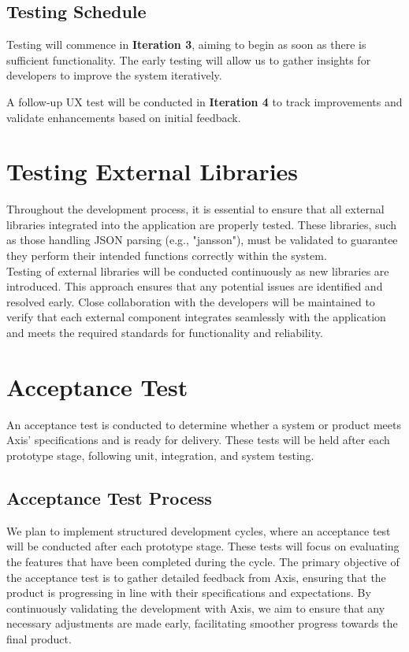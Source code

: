 \documentclass{article}
\begin{document}
\subsection{Testing Schedule}
Testing will commence in \textbf{Iteration 3}, aiming to begin as soon as there is sufficient functionality. The early testing will allow us to gather insights for developers to improve the system iteratively.

A follow-up UX test will be conducted in \textbf{Iteration 4} to track improvements and validate enhancements based on initial feedback.



\section{Testing External Libraries}
Throughout the development process, it is essential to ensure that all external libraries integrated into the application are properly tested. These libraries, such as those handling JSON parsing (e.g., "jansson"), must be validated to guarantee they perform their intended functions correctly within the system.\\

Testing of external libraries will be conducted continuously as new libraries are introduced. This approach ensures that any potential issues are identified and resolved early. Close collaboration with the developers will be maintained to verify that each external component integrates seamlessly with the application and meets the required standards for functionality and reliability.


\section{Acceptance Test}
An acceptance test is conducted to determine whether a system or product meets Axis' specifications and is ready for delivery. These tests will be held after each prototype stage, following unit, integration, and system testing.


\subsection{Acceptance Test Process}
We plan to implement structured development cycles, where an acceptance test will be conducted after each prototype stage. These tests will focus on evaluating the features that have been completed during the cycle. The primary objective of the acceptance test is to gather detailed feedback from Axis, ensuring that the product is progressing in line with their specifications and expectations. By continuously validating the development with Axis, we aim to ensure that any necessary adjustments are made early, facilitating smoother progress towards the final product.
\end{document}
